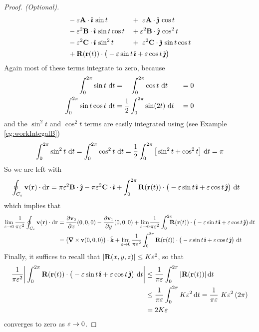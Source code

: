 \begin{proof}[Proof. (Optional)]
\begin{alignat*}{5}
& -\veps\vA\cdot\hi\,\sin t
&&+\ \veps\vA\cdot\hj\,\cos t \\ 
&-\veps^2\vB\cdot\hi\,\sin t\cos t
&&+\veps^2\vB\cdot\hj\,\cos^2t \\ 
&-\veps^2\vC\cdot\hi\,\sin^2 t 
&&+\ \veps^2\vC\cdot\hj\,\sin t\cos t \\ 
&+\vR(\vr(t))\cdot \big(-\veps\sin t\,\hi +\veps\cos t\,\hj\big)\hidewidth
\end{alignat*}
Again most of these terms integrate to zero, because
\begin{alignat*}{3}
\int_0^{2\pi}\sin t\ \mathrm{d}t
   &=\hskip10pt\int_0^{2\pi}\cos t\ \mathrm{d}t
   &&=0 \\
\int_0^{2\pi}\sin t\cos t\ \mathrm{d}t 
&= \frac{1}{2}\int_0^{2\pi}\sin(2t)\ \mathrm{d}t
&&=0
\end{alignat*}
and the $\sin^2t$ and $\cos^2 t$ terms are easily integrated using
(see Example \ref{eg:workIntegalB})
\begin{equation*}
\int_0^{2\pi}\sin^2 t\ \dee{t}=\int_0^{2\pi}\cos^2 t\ \dee{t}
=\frac{1}{2}\int_0^{2\pi}\big[\sin^2t+\cos^2 t\big]\ \dee{t}=\pi
\end{equation*}
So we are left with
\begin{align*}
\oint_{C_\varepsilon} \mathbf{v}(\mathbf{r})\cdot \mathrm{d}\mathbf{r}
&= \pi\varepsilon^2\mathbf{B}\cdot\hat{\pmb{\jmath}} - \pi\varepsilon^2\mathbf{C}\cdot\hat{\pmb{\imath}}
+\int_0^{2\pi} \mathbf{R}(\mathbf{r}(t))
        \cdot \big(-\varepsilon\sin t\,\hat{\pmb{\imath}} +\varepsilon\cos t\,\hat{\pmb{\jmath}}\big)\ \mathrm{d}t
\end{align*}
which implies that
\begin{align*}
\lim_{\veps\rightarrow 0}\frac{1}{\pi\veps^2}
         \oint_{C_\veps} \vv(\vr)\cdot \dee{\vr}
&= \frac{\partial \vv_2}{\partial x}(0,0,0) 
  - \frac{\partial \vv_1}{\partial y}(0,0,0)
   +\lim_{\veps\rightarrow 0}\!
     \frac{1}{\pi\veps^2}
           \int_0^{2\pi}\!\!\!\! \vR(\vr(t))
        \cdot \big(-\veps\sin t\,\hi +\veps\cos t\,\hj\big)\,\dee{t} \\
&= \big(\vnabla\times\vv(0,0,0)\big)\cdot\hk
   +\lim_{\veps\rightarrow 0}
     \frac{1}{\pi\veps^2}
           \int_0^{2\pi} \vR(\vr(t))
        \cdot \big(-\veps\sin t\,\hi +\veps\cos t\,\hj\big)\ \dee{t}
\end{align*}
Finally, it suffices to recall that
$|\mathbf{R}(x,y,z)|\le K\varepsilon^2$, so that
\begin{align*}
\frac{1}{\pi\varepsilon^2}\bigg|
            \int_0^{2\pi} \mathbf{R}(\mathbf{r}(t))
        \cdot \big(-\varepsilon\sin t\,\hat{\pmb{\imath}} +\varepsilon\cos t\,\hat{\pmb{\jmath}}\big)\ \mathrm{d}t \bigg|
&\le \frac{1}{\pi\varepsilon}
            \int_0^{2\pi}|\mathbf{R}(\mathbf{r}(t))|\,\mathrm{d}t  \\
&\le \frac{1}{\pi\varepsilon}
           \int_0^{2\pi}K\varepsilon^2\,\mathrm{d}t 
= \frac{1}{\pi\varepsilon} \ K\varepsilon^2\,(2\pi) \\
&= 2K\varepsilon
\end{align*}
converges to zero as $\varepsilon\rightarrow 0$.


\end{proof}
